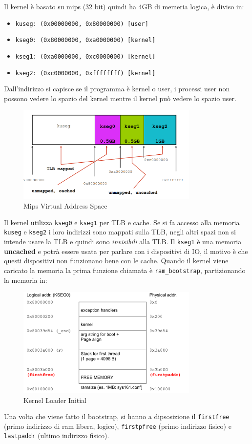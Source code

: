\documentclass[12pt]{article}
\begin{document}
Il kernel \`e basato su mips (32 bit) quindi ha 4GB di memeria logica, \`e diviso in:
\begin{itemize}
  \item \texttt{kuseg: (0x00000000, 0x80000000) [user]}
  \item \texttt{kseg0: (0x80000000, 0xa0000000) [kernel]}
  \item \texttt{kseg1: (0xa0000000, 0xc0000000) [kernel]}
  \item \texttt{kseg2: (0xc0000000, 0xffffffff) [kernel]}
\end{itemize}
Dall'indirizzo si capisce se il programma \`e kernel o user, i processi user non possono vedere lo spazio del kernel mentre il kernel pu\`o vedere lo spazio user.
\begin{figure}[H]
  \centering
  \includegraphics[width=0.8\textwidth]{mips-virtual-address-space.png}
  \caption{Mips Virtual Address Space}
  \label{fig:mips-virtual-address-space}
\end{figure}
Il kernel utilizza \texttt{kseg0} e \texttt{kseg1} per TLB e cache. Se si fa accesso alla memoria \texttt{kuseg} e \texttt{kseg2} i loro indirizzi sono mappati sulla TLB, negli altri spazi non si intende usare la TLB e quindi sono \emph{invisibili} alla TLB. Il \texttt{kseg1} \`e una memoria \textbf{uncached} e potr\`a essere usata per parlare con i dispositivi di IO, il motivo \`e che questi dispositivi non funzionano bene con le cache. Quando il kernel viene caricato la memoria la prima funzione chiamata \`e \texttt{ram\_bootstrap}, partizionando la memoria in:
\begin{figure}[H]
  \centering
  \includegraphics[width=0.8\textwidth]{kernel-loader-initial.png}
  \caption{Kernel Loader Initial}
  \label{fig:kernel-loader-initial}
\end{figure}
Una volta che viene fatto il bootstrap, si hanno a dipsosizione il \texttt{firstfree} (primo indirizzo di ram libera, logico), \texttt{firstpfree} (primo indirizzo fisico) e \texttt{lastpaddr} (ultimo indirizzo fisico).
\end{document}
